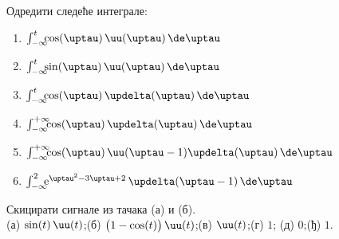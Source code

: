 \noindent
\PID Одредити следеће интеграле: 
\begin{multicols}{3}
\begin{enumerate}[label=(\alph*)]
\item $\int_{-\infty}^t \hspace*{-0.5em}
\cos (\uptau)\,\uu(\uptau)\,\de\uptau$
\item $\int_{-\infty}^t \hspace*{-0.5em}
\sin (\uptau)\,\uu(\uptau)\,\de\uptau$
\item $\int_{-\infty}^t \hspace*{-0.5em}
\cos (\uptau)\,\updelta(\uptau)\,\de\uptau$
\item $\int_{-\infty}^{+\infty} \hspace*{-0.5em}
\cos (\uptau)\,\updelta(\uptau)\,\de\uptau$
\item $\int_{-\infty}^{+\infty} \hspace*{-0.5em}
\cos (\uptau)\,\uu(\uptau-1)\updelta(\uptau)\,\de\uptau$
\item $\int_{-\infty}^{2}
 \hspace*{-0.5em}
{\rm e}^{\uptau^2 - 3\uptau + 2} \, \updelta(\uptau-1) \,\de\uptau$
\end{enumerate}
\end{multicols}
\noindent
Скицирати сигнале из тачака (а) и (б).
\\[2mm]

\REZULTAT 
(а) $\sin(t)\,\uu(t)$;\hfill (б) $\bigl(1 - \cos(t)\bigr)\,\uu(t)$;\hfill (в) $\uu(t)$;\hfill (г) $1$;\hfill 
(д) $0$;\hfill (ђ) $1$.
